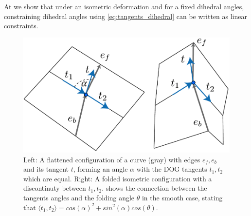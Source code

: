 At  we show that under an isometric deformation and for a fixed dihedral angles, constraining dihedral angles using \eqref{eq:tangents_dihedral} can be written as linear constraints.

\begin{figure} [h]
	\centering
	\includegraphics[width=\linewidth]{figures/fold_angle_and_tangent_angles}
	\caption{Left: A flattened configuration of a curve (gray) with edges $e_f,e_b$ and its tangent $t$, forming an angle $\alpha$ with the DOG tangents $t_1,t_2$ which are equal. Right: A folded isometric configuration with a discontinuty between $t_1,t_2$.  shows the connection between the tangents angles and the folding angle $\theta$ in the smooth case, stating that $\langle t_1, t_2 \rangle = cos(\alpha)^2 + sin^2(\alpha) cos(\theta)$. }
	\label{fig:fold_angle_and_tangent_angles}
\end{figure}

